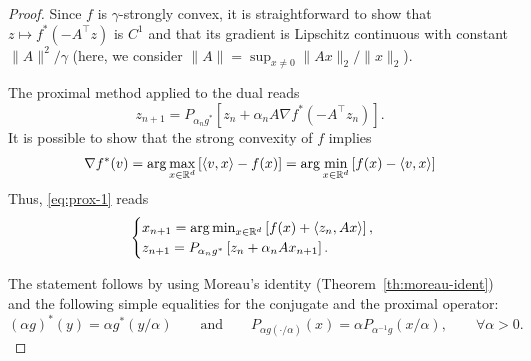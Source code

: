  \begin{proof}
     Since $f$ is $\gamma$-strongly convex, it is straightforward to show that $z\mapsto f^*(-A^\top z)$ is $C^1$ and that its gradient is Lipschitz continuous with constant $\|A\|^2/\gamma$ (here, we consider $\|A\|=\sup_{x\neq 0} \|Ax\|_2/\|x\|_2$).
 
     The proximal method applied to the dual reads
     \begin{equation}
         \label{eq:prox-1}
         z_{n+1} = P_{\alpha_n g^*}\left[ z_n + \alpha_n A \nabla f^*(-A^\top z_n) \right].
     \end{equation}
     It is possible to show that the strong convexity of $f$ implies
     \begin{equation}
         \nabla f^* (v) = \arg\max_{x\in\mathbb{R}^d} \left[\langle v,x\rangle - f(x) \right]
         = \arg\min_{x\in\mathbb{R}^d} \left[f(x)-\langle v,x\rangle \right]
     \end{equation}
     Thus, \eqref{eq:prox-1} reads
     \begin{equation}
         \begin{cases}
             x_{n+1} =\arg\min_{x\in\mathbb{R}^d} \left[f(x)+\langle z_n,Ax\rangle \right] , \\
             z_{n+1}=P_{\alpha_n g^*}\left[ z_n + \alpha_n A x_{n+1} \right].
         \end{cases}
     \end{equation}
 
     The statement follows by using Moreau's identity (Theorem~\ref{th:moreau-ident}) and the following simple equalities for the conjugate and the proximal operator:
     \begin{equation}
         (\alpha g)^*(y) = \alpha g^*(y / \alpha)
         \qquad\text{and}\qquad
         P_{\alpha g(\cdot/\alpha)} (x) = \alpha P_{\alpha^{-1}g}(x/\alpha),
         \qquad \forall\alpha>0.
     \end{equation}
 \end{proof}
 
